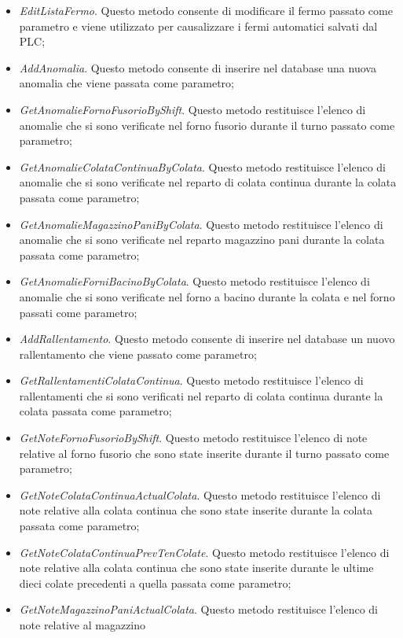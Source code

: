 \begin{itemize}
    \item \textit{EditListaFermo}. Questo metodo consente di modificare il fermo passato come parametro e viene
    utilizzato per causalizzare i fermi automatici salvati dal PLC;
    \item \textit{AddAnomalia}. Questo metodo consente di inserire nel database una nuova anomalia che viene
    passata come parametro;
    \item \textit{GetAnomalieFornoFusorioByShift}. Questo metodo restituisce l'elenco di anomalie che si sono
    verificate nel forno fusorio durante il turno passato come parametro;
    \item \textit{GetAnomalieColataContinuaByColata}. Questo metodo restituisce l'elenco di anomalie che si sono
    verificate nel reparto di colata continua durante la colata passata come parametro;
    \item \textit{GetAnomalieMagazzinoPaniByColata}. Questo metodo restituisce l'elenco di anomalie che si sono
    verificate nel reparto magazzino pani durante la colata passata come parametro;
    \item \textit{GetAnomalieForniBacinoByColata}. Questo metodo restituisce l'elenco di anomalie che si sono
    verificate nel forno a bacino durante la colata e nel forno passati come parametro;
    \item \textit{AddRallentamento}. Questo metodo consente di inserire nel database un nuovo rallentamento che
    viene passato come parametro;
    \item \textit{GetRallentamentiColataContinua}. Questo metodo restituisce l'elenco di rallentamenti che si sono
    verificati nel reparto di colata continua durante la colata passata come parametro;
    \item \textit{GetNoteFornoFusorioByShift}. Questo metodo restituisce l'elenco di note relative al forno fusorio che
    sono state inserite durante il turno passato come parametro;
    \item \textit{GetNoteColataContinuaActualColata}. Questo metodo restituisce l'elenco di note relative alla colata
    continua che sono state inserite durante la colata passata come parametro;
    \item \textit{GetNoteColataContinuaPrevTenColate}. Questo metodo restituisce l'elenco di note relative alla colata
    continua che sono state inserite durante le ultime dieci colate precedenti a quella passata come parametro;
    \item \textit{GetNoteMagazzinoPaniActualColata}. Questo metodo restituisce l'elenco di note relative al magazzino

\end{itemize}
